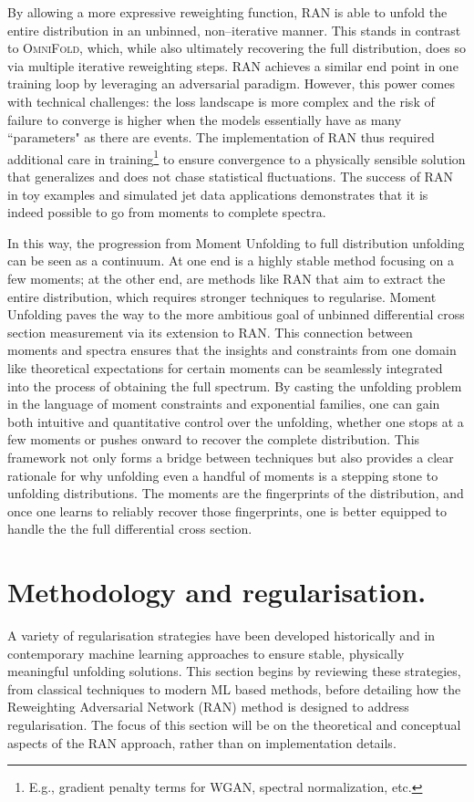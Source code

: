 {{        By allowing a more expressive reweighting function, RAN is able to unfold the entire distribution in an unbinned, non--iterative manner.
        This stands in contrast to \textsc{OmniFold}, which, while also ultimately recovering the full distribution, does so via multiple iterative reweighting steps.
        RAN achieves a similar end point in one training loop by leveraging an adversarial paradigm.
        However, this power comes with technical challenges: the loss landscape is more complex and the risk of failure to converge is higher when the models essentially have as many ``parameters" as there are events.
        The implementation of RAN thus required additional care in training\footnote{E.g., gradient penalty terms for WGAN, spectral normalization, etc.} to ensure convergence to a physically sensible solution that generalizes and does not chase statistical fluctuations.
        The success of RAN in toy examples and simulated jet data applications demonstrates that it is indeed possible to go from moments to complete spectra.

In this way, the progression from Moment Unfolding to full distribution unfolding can be seen as a continuum.
%
At one end is a highly stable method focusing on a few moments; at the other end, are methods like RAN that aim to extract the entire distribution, which requires stronger techniques to regularise.
%
Moment Unfolding paves the way to the more ambitious goal of unbinned differential cross section measurement via its extension to RAN.
%
This connection between moments and spectra ensures that the insights and constraints from one domain like theoretical expectations for certain moments can be seamlessly integrated into the process of obtaining the full spectrum.
%
By casting the unfolding problem in the language of moment constraints and exponential families, one can gain both intuitive and quantitative control over the unfolding, whether one stops at a few moments or pushes onward to recover the complete distribution.
%
This framework not only forms a bridge between techniques but also provides a clear rationale for why unfolding even a handful of moments is a stepping stone to unfolding distributions.
%
The moments are the fingerprints of the distribution, and once one learns to reliably recover those fingerprints, one is better equipped to handle the the full differential cross section.

\section{Methodology and regularisation.}
\label{sec:ran-methodology-and-regularisation}
    A variety of regularisation strategies have been developed historically and in contemporary machine learning approaches to ensure stable, physically meaningful unfolding solutions.
    This section begins by reviewing these strategies, from classical techniques to modern ML based methods, before detailing how the Reweighting Adversarial Network (RAN) method is designed to address regularisation.
    The focus of this section will be on the theoretical and conceptual aspects of the RAN approach, rather than on implementation details.

}}
